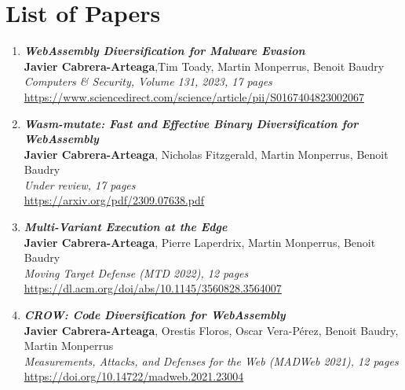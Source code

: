 
\chapter{List of Papers}

\vspace{1cm}
\begin{enumerate}[I]
    \item \textbf{\textit{WebAssembly Diversification for Malware Evasion}} \\
        \textbf{Javier Cabrera-Arteaga},Tim Toady, Martin Monperrus, Benoit Baudry\\
        \textit{Computers \& Security, Volume 131, 2023, 17 pages} \\
        \url{https://www.sciencedirect.com/science/article/pii/S0167404823002067}
    \item \textbf{\textit{Wasm-mutate: Fast and Effective Binary Diversification for
    WebAssembly}} \\
        \textbf{Javier Cabrera-Arteaga}, Nicholas Fitzgerald, Martin Monperrus, Benoit Baudry\\
        \textit{Under review, 17 pages} \\
        \url{https://arxiv.org/pdf/2309.07638.pdf}    
    \item \textbf{\textit{Multi-Variant Execution at the Edge}} \\
    \textbf{Javier Cabrera-Arteaga}, Pierre Laperdrix, Martin Monperrus, Benoit Baudry\\
    \textit{Moving Target Defense (MTD 2022), 12 pages} \\
    \url{https://dl.acm.org/doi/abs/10.1145/3560828.3564007}

    \item \textbf{\textit{CROW: Code Diversification for WebAssembly}} \\
        \textbf{Javier Cabrera-Arteaga}, Orestis Floros, Oscar Vera-Pérez, Benoit Baudry, Martin Monperrus\\
        \textit{ Measurements, Attacks, and Defenses for the Web (MADWeb 2021), 12 pages} \\
        \url{https://doi.org/10.14722/madweb.2021.23004}
    

\end{enumerate}
